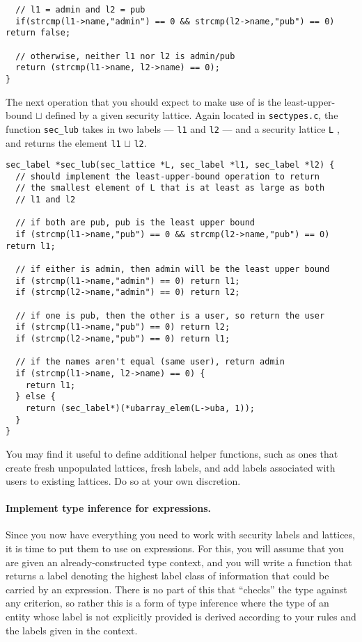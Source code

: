 \documentclass[11pt]{article}
\begin{document}
{\begin{lstlisting}
  // l1 = admin and l2 = pub
  if(strcmp(l1->name,"admin") == 0 && strcmp(l2->name,"pub") == 0) return false;
   
  // otherwise, neither l1 nor l2 is admin/pub
  return (strcmp(l1->name, l2->name) == 0); 
}
\end{lstlisting}
The next operation that you should expect to make use of is the least-upper-bound $\sqcup$ defined by a given security lattice. 
Again located in \verb'sectypes.c', the function \verb'sec_lub' takes  in two labels --- 
\verb'l1' and \verb'l2' --- and a security lattice \verb'L'
, and returns the element \verb'l1' $\sqcup$ \verb'l2'.
\begin{lstlisting}
sec_label *sec_lub(sec_lattice *L, sec_label *l1, sec_label *l2) {
  // should implement the least-upper-bound operation to return 
  // the smallest element of L that is at least as large as both
  // l1 and l2
  
  // if both are pub, pub is the least upper bound
  if (strcmp(l1->name,"pub") == 0 && strcmp(l2->name,"pub") == 0) return l1;

  // if either is admin, then admin will be the least upper bound
  if (strcmp(l1->name,"admin") == 0) return l1;
  if (strcmp(l2->name,"admin") == 0) return l2;

  // if one is pub, then the other is a user, so return the user
  if (strcmp(l1->name,"pub") == 0) return l2;
  if (strcmp(l2->name,"pub") == 0) return l1;

  // if the names aren't equal (same user), return admin
  if (strcmp(l1->name, l2->name) == 0) {
    return l1;
  } else {
    return (sec_label*)(*ubarray_elem(L->uba, 1));
  }   
}
\end{lstlisting}

You may find it useful to define additional helper functions, 
such as ones that create fresh unpopulated lattices, fresh labels, and add labels 
associated with users to existing lattices. Do so at your own discretion.

\paragraph{Implement type inference for expressions.} Since you now have everything 
you need to work with security labels and lattices, it is time to put them to use on expressions. 
For this, you will assume that you are given an already-constructed type context, and you will write a 
function that returns a label denoting the highest label class of information that could be carried by an expression. 
There is no part of this that ``checks'' the type against any criterion, so rather this is a form of type inference 
where the type of an entity whose label is not explicitly provided is derived according to your rules and the labels given in the context.

}
\end{document}
